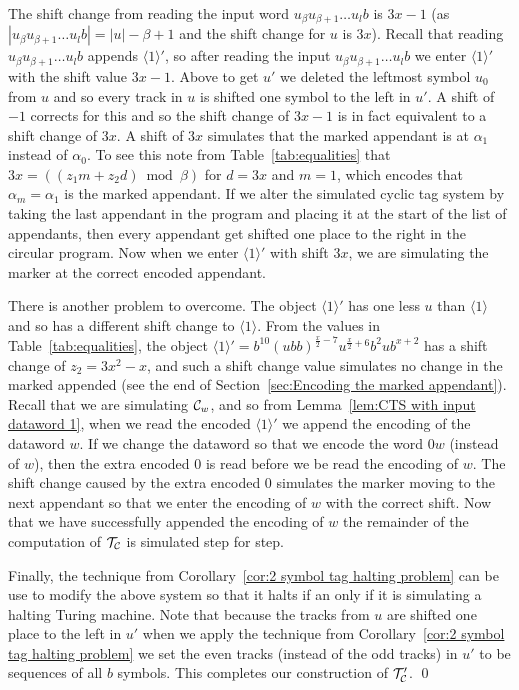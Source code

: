 \documentclass[11pt]{article} \usepackage{amsfonts,amsmath,amssymb,amsthm}
\renewenvironment{proof}{{\bfseries\noindent Proof.}}{\qed\vspace{3.5ex}}
\newcommand{\tne}[1]{\ensuremath{\langle #1\rangle}}
\newcommand{\encodeOne}{\tne{1}}
\begin{document}
\begin{proof}
The shift change from reading the input word $u_{\beta}u_{\beta+1}\ldots u_lb$ is $3x-1$ (as $|u_{\beta}u_{\beta+1}\ldots u_lb|=|u|-\beta+1$ and the shift change for $u$ is $3x$). 
Recall that reading $u_{\beta}u_{\beta+1}\ldots u_lb$ appends $\encodeOne'$, so after reading the input $u_{\beta}u_{\beta+1}\ldots u_lb$ we enter $\encodeOne'$ with the shift value $3x-1$.
Above to get $u'$ we deleted the leftmost symbol $u_{0}$ from $u$ and so every track in $u$ is shifted one symbol to the left in $u'$. A shift of $-1$ corrects for this and so the shift change of $3x-1$ is in fact equivalent to a shift change of $3x$.
A shift of $3x$ simulates that the marked appendant is at $\alpha_1$ instead of $\alpha_0$. 
To see this note from Table~\ref{tab:equalities} that $3x=((z_1m+z_2d)\bmod\beta)$ for $d=3x$ and $m=1$, which encodes that $\alpha_{m}=\alpha_{1}$ is the marked appendant. 
If we alter the simulated cyclic tag system by taking the last appendant in the program and placing it at the start of the list of appendants, then every appendant get shifted one place to the right in the circular program. 
Now when we enter $\encodeOne'$ with shift $3x$, we are simulating the marker at the correct encoded appendant. 

There is another problem to overcome. 
The object $\encodeOne'$ has one less $u$ than $\encodeOne$ and so has a different shift change to $\encodeOne$.
From the values in Table~\ref{tab:equalities}, the object $\encodeOne'=b^{10}(ubb)^{\frac{x}{2}-7}u^{\frac{x}{2}+6}b^{2}ub^{x+2}$ has a shift change of $z_2=3x^2-x$, and such a shift change value simulates no change in the marked appended (see the end of Section~\ref{sec:Encoding the marked appendant}). 
Recall that we are simulating $\mathcal{C}_w$, and so from Lemma~\ref{lem:CTS with input dataword 1}, when we read the encoded $\encodeOne'$ we append the encoding of the dataword $w$. 
If we change the dataword so that we encode the word $0w$ (instead of $w$), then the extra encoded $0$ is read before we be read the encoding of $w$. 
The shift change caused by the extra encoded $0$ simulates the marker moving to the next appendant so that we enter the encoding of $w$ with the correct shift. 
Now that we have successfully appended the encoding of $w$ the remainder of the computation of $\mathcal{T_{\mathcal{C}}}$ is simulated step for step. 

Finally, the technique from  Corollary~\ref{cor:2 symbol tag halting problem} can be use to modify the above system so that it halts if an only if it is simulating a halting Turing machine. Note that because the tracks from $u$ are shifted one place to the left in $u'$ when we apply the technique from  Corollary~\ref{cor:2 symbol tag halting problem} we set the even tracks (instead of the odd tracks) in $u'$ to be sequences of all $b$ symbols. This completes our construction of $\mathcal{T'_{\mathcal{C}}}$.
\end{proof}
\end{document}
